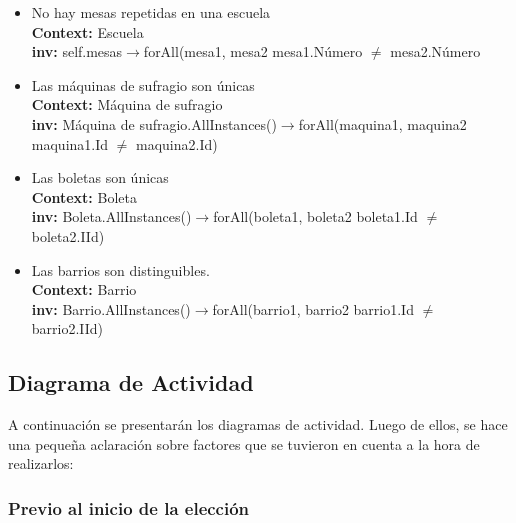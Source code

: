\documentclass[spanish, 10pt,a4paper]{article}
\numberwithin{equation}{section} %
\begin{document}
\begin{itemize}
	\item No hay mesas repetidas en una escuela
\\	\textbf{Context: }  Escuela
\\	\textbf{inv: } self.mesas$\rightarrow$forAll(mesa1, mesa2 \textbar mesa1.Número $\neq$ mesa2.Número

	\item Las máquinas de sufragio son únicas
\\	\textbf{Context: }  Máquina de sufragio
\\	\textbf{inv: } Máquina de sufragio.AllInstances()$\rightarrow$forAll(maquina1, maquina2 \textbar maquina1.Id $\neq$ maquina2.Id)

	\item Las boletas son únicas
\\	\textbf{Context: }  Boleta
\\	\textbf{inv: } Boleta.AllInstances()$\rightarrow$forAll(boleta1, boleta2 \textbar boleta1.Id $\neq$ boleta2.IId)

	\item Las barrios son distinguibles.
\\	\textbf{Context: }  Barrio
\\	\textbf{inv: } Barrio.AllInstances()$\rightarrow$forAll(barrio1, barrio2 \textbar barrio1.Id $\neq$ barrio2.IId)
\end{itemize}

\subsection{Diagrama de Actividad}
A continuación se presentarán los diagramas de actividad. Luego de ellos, se hace una pequeña aclaración sobre factores que se tuvieron en cuenta a la hora de realizarlos:

\subsubsection{Previo al inicio de la elección}
\end{document}
